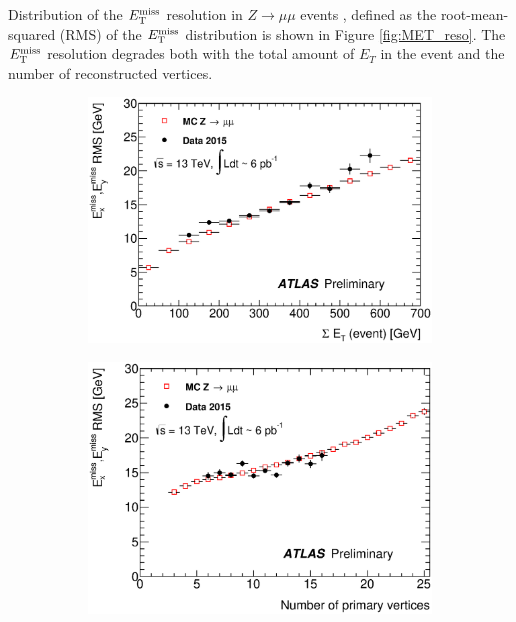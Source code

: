 \indent Distribution of the $E_{\mathrm{T}}^{\mathrm{miss}}$ resolution in $Z\rightarrow \mu\mu$ events , defined as the root-mean-squared (RMS) of the $E_{\mathrm{T}}^{\mathrm{miss}}$ distribution is shown in Figure \ref{fig:MET_reso}.  The $E_{\mathrm{T}}^{\mathrm{miss}}$ resolution degrades both with the total amount of $E_T$ in the event and the number of reconstructed vertices.\\

\begin{figure}[h!]
  \begin{center}
      \begin{subfigure}[b]{0.40\textwidth}   
    \includegraphics[width=\textwidth]{figures/METCalib/METReso_Et.eps}
    \caption{ }
    \end{subfigure}
          \begin{subfigure}[b]{0.40\textwidth}  
    \includegraphics[width=\textwidth]{figures/METCalib/METReso_nVtx.eps}

\end{subfigure}
\end{center}
\end{figure}
